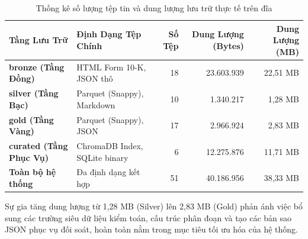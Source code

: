 \begin{table}[htbp]
\centering
\scriptsize
\setlength{\tabcolsep}{3.5pt}
\caption{Thống kê số lượng tệp tin và dung lượng lưu trữ thực tế trên đĩa}
\label{tab:storage_metrics}
\begin{tabularx}{\textwidth}{l X r r r}
\toprule
\textbf{Tầng Lưu Trữ} & \textbf{Định Dạng Tệp Chính} & \textbf{Số Tệp} & \textbf{Dung Lượng (Bytes)} & \textbf{Dung Lượng (MB)} \\
\midrule
\textbf{bronze (Tầng Đồng)} & HTML Form 10-K, JSON thô & 18 & 23.603.939 & 22,51 MB \\
\textbf{silver (Tầng Bạc)} & Parquet (Snappy), Markdown & 10 & 1.340.217 & 1,28 MB \\
\textbf{gold (Tầng Vàng)} & Parquet (Snappy), JSON & 17 & 2.966.924 & 2,83 MB \\
\textbf{curated (Tầng Phục Vụ)} & ChromaDB Index, SQLite binary & 6 & 12.275.876 & 11,71 MB \\
\midrule
\textbf{Toàn bộ hệ thống} & Đa định dạng kết hợp & 51 & 40.186.956 & 38,33 MB \\
\bottomrule
\end{tabularx}
\end{table}

Sự gia tăng dung lượng từ 1,28 MB (Silver) lên 2,83 MB (Gold) phản ánh việc bổ sung các trường siêu dữ liệu kiểm toán, cấu trúc phân đoạn và tạo các bản sao JSON phục vụ đối soát, hoàn toàn nằm trong mục tiêu tối ưu hóa của hệ thống.
